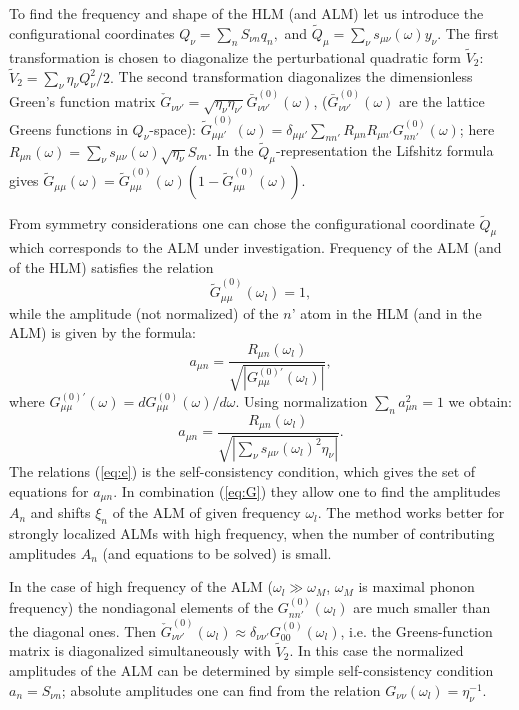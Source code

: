 To find the frequency and shape of the HLM (and ALM) let us 
introduce the 
configurational coordinates $Q_{\nu} = \sum_{n} S_{\nu n} q_n,$ and  
$\tilde{Q}_{\mu} = \sum_{\nu} s_{\mu \nu} (\omega) y_{\nu}$. The first 
transformation is chosen to diagonalize the perturbational quadratic form 
$\tilde{V}_2$: $\tilde{V}_2 = \sum_{\nu} \eta_{\nu} Q_{\nu}^2/2.$
The second transformation diagonalizes the dimensionless 
Green's function matrix $\check{G}_{\nu \nu'}=
\sqrt{\eta_{\nu} \eta_{\nu'}}\bar{G}^{(0)}_{\nu\nu'}(\omega)$, 
($\bar{G}^{(0)}_{\nu\nu'}(\omega)$ are the lattice Greens functions  
in $Q_{\nu}$-space): 
$\tilde{G}^{(0)}_{\mu \mu'}(\omega) = \delta _{\mu \mu'} 
\sum_{nn'} R_{\mu n}R_{\mu n'} G^{(0)}_{n n'} (\omega)$; here
$R_{\mu n} (\omega) =  
\sum_{\nu} s_{\mu \nu}(\omega) \sqrt{\eta_{\nu}} S_{\nu n}$. 
In the $\tilde{Q}_{\mu}$-representation the Lifshitz formula gives 
$\tilde{G}_{\mu \mu}(\omega) =  
{\tilde{G}^{(0)}_{\mu \mu}(\omega)}{(1 -\tilde{G}^{(0)}_{\mu \mu}(\omega))}.$

From symmetry considerations one can chose the configurational 
coordinate $\tilde{Q}_{\mu}$ which corresponds to the ALM under investigation. 
Frequency of the ALM (and of the HLM) satisfies the relation
\begin{equation} 
\tilde{G}^{(0)}_{\mu \mu}(\omega_l) = 1, \label{eq:G} 
\end{equation} 
while the amplitude (not normalized) of the $n$' atom in the HLM (and in the 
ALM) is given by the formula: 
\begin{equation}
a_{\mu n} = \frac{R_{\mu n}(\omega_l)}{\sqrt{|G^{(0)'}_{\mu \mu} (\omega_l)|}},
\label{eq:d}
\end{equation} 
where  
$G^{(0)'}_{\mu \mu}(\omega) = d G^{(0)}_{\mu \mu}(\omega)/ d \omega$. 
Using normalization $\sum_n a_{\mu n}^2 = 1$ we obtain: 
\begin{equation} 
a_{\mu n} = 
\frac{R_{\mu n}(\omega_l)}{\sqrt{|\sum_{\nu} s_{\mu \nu}(\omega_l)^2 
\eta_{\nu}|}}. 
\label{eq:e}
\end{equation} 
The relations (\ref{eq:e})  is the self-consistency condition, 
which gives the set of equations for $a_{\mu n}$. 
In combination 
(\ref{eq:G}) they allow one to find the amplitudes $A_{n}$ and shifts
$\xi_n$ of the ALM of 
given frequency $\omega_l$. The method works better for strongly localized 
ALMs with high frequency, when the number of contributing amplitudes $A_n$
(and equations to be solved) is small. 

In the case of high frequency of the ALM  ($\omega_l \gg \omega_M$, $\omega_M$ 
is maximal phonon frequency) the nondiagonal elements of the  
$G^{(0)}_{nn'}(\omega_l)$ are much smaller than the diagonal ones. Then 
$\check{G}^{(0)}_{\nu \nu'}(\omega_l) \approx \delta_{\nu \nu'}  
G^{(0)}_{00}(\omega_l)$, i.e. the Greens-function matrix 
is diagonalized simultaneously with $\tilde{V}_2$. In this case the normalized
amplitudes of the ALM can be determined by simple self-consistency 
condition $a_n =  S_{\nu n}$; absolute amplitudes one can  find from the
relation $G_{\nu \nu}(\omega_l) = \eta_{\nu}^{-1}$. 

